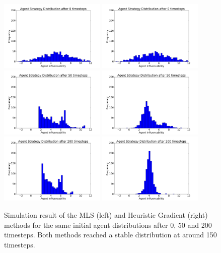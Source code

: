 \documentclass[11pt]{article}
\begin{document}
\begin{figure}
  \centering
  \quad
  \includegraphics[width=0.45\textwidth]{figures/heuristic_vs_mls_1.png}
  \includegraphics[width=0.45\textwidth]{figures/heuristic_vs_mls_4.png}
  \includegraphics[width=0.45\textwidth]{figures/heuristic_vs_mls_2.png}
  \includegraphics[width=0.45\textwidth]{figures/heuristic_vs_mls_5.png}
  \includegraphics[width=0.45\textwidth]{figures/heuristic_vs_mls_3.png}
  \includegraphics[width=0.45\textwidth]{figures/heuristic_vs_mls_6.png}
  \caption[Comparison MLS and Heuristic Gradient]{Simulation result of the MLS (left) and Heuristic Gradient (right) methods for the same initial agent distributions after 0, 50 and 200 timesteps. Both methods reached a stable distribution at around 150 timesteps.}
  \label{fig:heuristicvsmls}
\end{figure}
\end{document}
